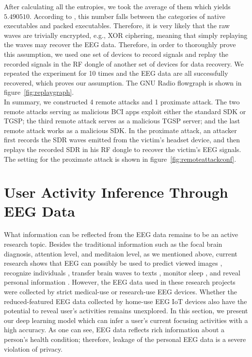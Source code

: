 %
\indent After calculating all the entropies, we took the average of them which yields $5.490510$. According to \cite{lyda2007using}, this number falls between the categories of native executables and packed executables. Therefore, it is very likely that the raw waves are trivially encrypted, e.g., XOR ciphering, meaning that simply replaying the waves may recover the EEG data. Therefore, in order to thoroughly prove this assumption, we used one set of devices to record signals and replay the recorded signals in the RF dongle of another set of devices for data recovery. We repeated the experiment for 10 times and the EEG data are all successfully recovered, which proves our assumption. The GNU Radio flowgraph is shown in figure~\ref{fig:replaygraph}.\\
%
\indent In summary, we constructed 4 remote attacks and 1 proximate attack. The two remote attacks serving as malicious BCI apps exploit either the standard SDK or TGSP; the third remote attack serves as a malicious TGSP server; and the last remote attack works as a malicious SDK. In the proximate attack, an attacker first records the SDR waves emitted from the victim's headset device, and then replays the recorded SDR in his RF dongle to recover the victim's EEG signals. The setting for the proximate attack is shown in figure~\ref{fig:remoteattackconf}.

\section{User Activity Inference Through EEG Data}
\label{sec:inference}

What information can be reflected from the EEG data remains to be an active research topic. Besides the traditional information such as the focal brain diagnosis, attention level, and meditaion level, as we mentioned above, current research shows that EEG can possibly be used to predict viewed images \cite{mindreading2017}, recognize individuals \cite{chu2017individual}, transfer brain waves to texts \cite{zhang2017converting}, monitor sleep \cite{nakamura2017automatic},  and reveal personal information \cite{martinovic2012feasibility}. However, the EEG data used in these research projects were collected by strict medical-use or research-use EEG devices. Whether the reduced-featured EEG data collected by home-use EEG IoT devices also have the potential to reveal user's activities remains unexplored. In this section, we present our deep learning model which can infer a user's current focusing activities with a high accuracy. As one can see, EEG data reflects rich information about a person's health condition; therefore, leakage of the personal EEG data is a severe violation of privacy.

